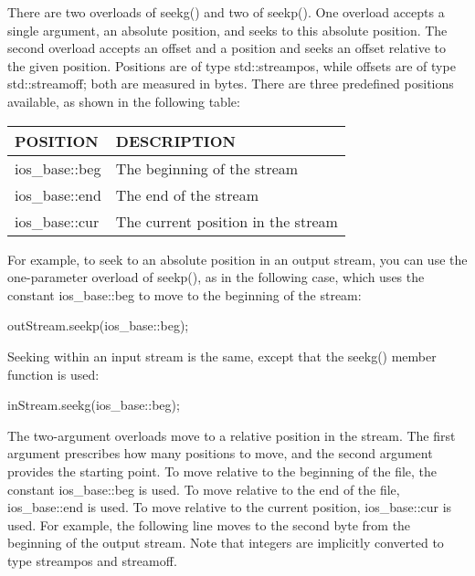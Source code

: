 There are two overloads of seekg() and two of seekp(). One overload accepts a single argument, an absolute position, and seeks to this absolute position. The second overload accepts an offset and a position and seeks an offset relative to the given position. Positions are of type std::streampos, while offsets are of type std::streamoff; both are measured in bytes. There are three predefined positions available, as shown in the following table:

\begin{longtable}{|l|l|}
\hline
\textbf{POSITION} & \textbf{DESCRIPTION}               \\ \hline
\endfirsthead
%
\endhead
%
ios\_base::beg    & The beginning of the stream        \\ \hline
ios\_base::end    & The end of the stream              \\ \hline
ios\_base::cur    & The current position in the stream \\ \hline
\end{longtable}


For example, to seek to an absolute position in an output stream, you can use the one-parameter overload of seekp(), as in the following case, which uses the constant ios\_base::beg to move to the beginning of the stream:

\begin{cpp}
outStream.seekp(ios_base::beg);
\end{cpp}

Seeking within an input stream is the same, except that the seekg() member function is used:

\begin{cpp}
inStream.seekg(ios_base::beg);
\end{cpp}

The two-argument overloads move to a relative position in the stream. The first argument prescribes how many positions to move, and the second argument provides the starting point. To move relative to the beginning of the file, the constant ios\_base::beg is used. To move relative to the end of the file, ios\_base::end is used. To move relative to the current position, ios\_base::cur is used. For example, the following line moves to the second byte from the beginning of the output stream. Note that integers are implicitly converted to type streampos and streamoff.

